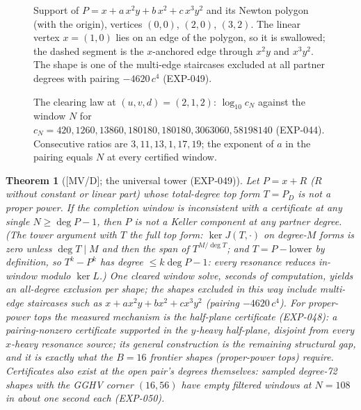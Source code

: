 \documentclass[11pt]{article}
\newtheorem{theorem}{Theorem}[section]
\theoremstyle{remark}
\begin{document}
\begin{figure}[t]
\centering
{}
\caption{Support of $P=x+a\,x^2y+b\,x^2+c\,x^3y^2$ and its Newton polygon (with the origin), vertices $(0,0)$, $(2,0)$, $(3,2)$. The linear vertex $x=(1,0)$ lies on an edge of the polygon, so it is swallowed; the dashed segment is the $x$-anchored edge through $x^2y$ and $x^3y^2$. The shape is one of the multi-edge staircases excluded at all partner degrees with pairing $-4620\,c^4$ (EXP-049).}\label{fig:staircase}
\end{figure}

\begin{figure}[t]
\centering

\caption{The clearing law at $(u,v,d)=(2,1,2)$: $\log_{10}c_N$ against the window $N$ for $c_N=420,1260,13860,180180,180180,3063060,58198140$ (EXP-044). Consecutive ratios are $3,11,13,1,17,19$; the exponent of $a$ in the pairing equals $N$ at every certified window.}\label{fig:window}
\end{figure}

\begin{theorem}[{[MV/D]}; the universal tower (EXP-049)]\label{thm:t6}
Let $P = x + R$ ($R$ without constant or linear part) whose total-degree top form
$T = P_D$ is \emph{not} a proper power. If the completion window is inconsistent with a
certificate at any single $N \ge \deg P - 1$, then $P$ is not a Keller component at \emph{any}
partner degree. (The tower argument with $T$ the full top form: $\ker J(T, \cdot)$ on
degree-$M$ forms is zero unless $\deg T \mid M$ and then the span of $T^{M/\deg T}$;
and $T = P - \text{lower}$ by definition, so $T^k - P^k$ has degree $\le k \deg P - 1$:
every resonance reduces in-window modulo $\ker L$.) One cleared window solve, seconds
of computation, yields an all-degree exclusion per shape; the shapes excluded in this way
include multi-edge staircases such as $x + a x^2 y + b x^2 + c x^3 y^2$ (pairing
$-4620\,c^4$). For proper-power tops the measured mechanism is the \emph{half-plane}
certificate \mbox{(EXP-048)}: a pairing-nonzero certificate supported in the $y$-heavy half-plane,
disjoint from every $x$-heavy resonance source; its general construction is the remaining
structural gap, and it is exactly what the $B = 16$ frontier shapes (proper-power tops)
require. Certificates also exist at the open pair's degrees themselves:
sampled degree-72 shapes with the GGHV corner $(16, 56)$ have empty filtered windows at
$N = 108$ in about one second each (EXP-050).
\end{theorem}
\end{document}
